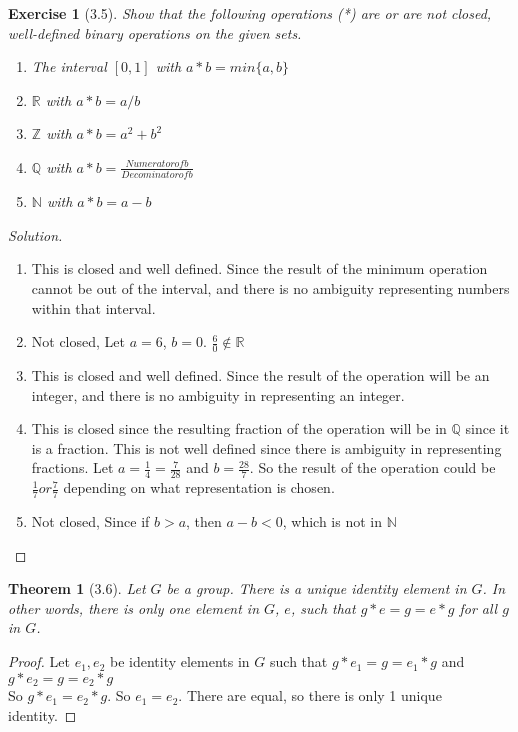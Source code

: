 \documentclass{article}
\newtheorem*{thm}{Theorem}
\newtheorem*{ex}{Exercise}
\newenvironment{solution}
  {\begin{proof}[Solution]}
  {\renewcommand{\qedsymbol}{}\end{proof}}
\begin{document}
\begin{ex}[3.5]
	Show that the following operations (*) are or are not closed, well-defined binary operations on the given sets. 
	\begin{enumerate}
	  \item The interval $[0,1]$ with $a*b = min\{a,b\}$
	  \item $\mathbb{R}$ with $a*b = a/b$
	  \item $\mathbb{Z}$ with $a*b = a^2 + b^2$
	  \item $\mathbb{Q}$ with $a*b = \frac{Numerator of b} {Decominator of b}$
	  \item $\mathbb{N}$ with $a*b = a-b$
	\end{enumerate}
\end{ex}
\begin{solution}
	\begin{enumerate}
	  \item This is closed and well defined. Since the result of the minimum operation cannot be out of the interval, and there is no ambiguity representing numbers within that interval.
	  \item Not closed, Let $a=6$, $b=0$. $\frac{6}{0} \notin \mathbb{R}$
	  \item This is closed and well defined. Since the result of the operation will be an integer, and there is no ambiguity in representing an integer. 
	  \item This is closed since the resulting fraction of the operation will be in $\mathbb{Q}$ since it is a fraction. This is not well defined since there is ambiguity in representing fractions. Let $a=\frac{1}{4} = \frac{7}{28}$
	    and $b=\frac{28}{7}$. So the result of the operation could be $\frac{1}{7} or \frac{7}{7}$ depending on what representation is chosen. 
	  \item Not closed, Since if $b>a$, then $a-b < 0$, which is not in $\mathbb{N}$

	\end{enumerate}
\end{solution}

\begin{thm}[3.6]
	Let $G$ be a group. There is a unique identity element in $G$. In other words, there is only one element in $G$, $e$, such that $g*e = g = e*g$ for all $g$ in $G$.
\end{thm}
\begin{proof}
	Let $e_1, e_2$ be identity elements in $G$ such that $g*e_1 = g = e_1 * g$ and $g*e_2 = g = e_2 *g$\\So $g*e_1 = e_2 *g$. So $e_1 = e_2$. There are equal, so there is only 1 unique identity.
\end{proof}
\end{document}
